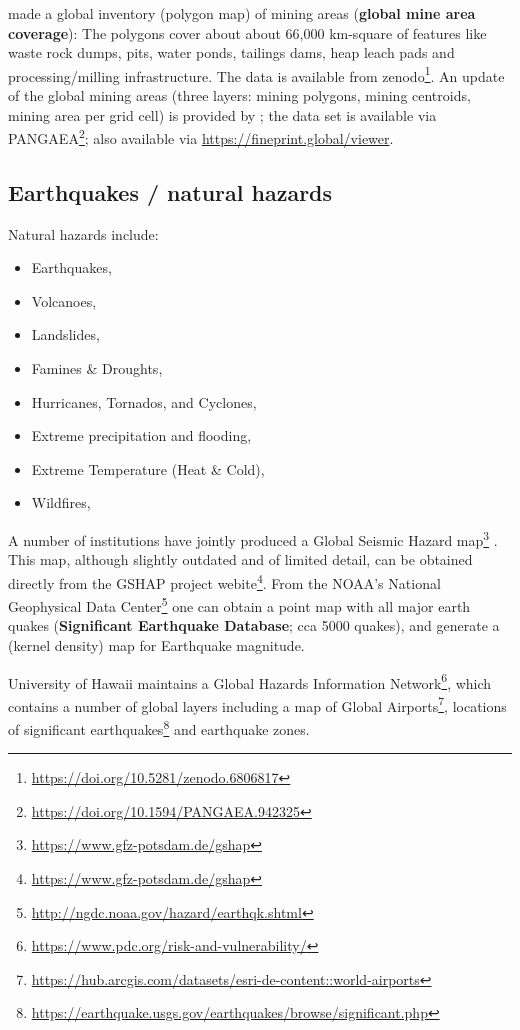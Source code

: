 \documentclass[
  graybox,natbib,nospthms]{svmono}
\providecommand{\tightlist}{%
  \setlength{\itemsep}{0pt}\setlength{\parskip}{0pt}}
\providecommand{\tightlist}{\setlength{\itemsep}{0pt}\setlength{\parskip}{0pt}}
\renewcommand{\href}[2]{#2 (\url{#1})}
\renewcommand{\href}[2]{#2\footnote{\url{#1}}}
\begin{document}
\citet{tang2023global} made a global inventory (polygon map) of mining areas (\textbf{global mine area coverage}):
The polygons cover about about 66,000 km-square of features like
waste rock dumps, pits, water ponds, tailings dams, heap leach
pads and processing/milling infrastructure.
The data is available from \href{https://doi.org/10.5281/zenodo.6806817}{zenodo}.
An update of the global mining areas (three layers: mining polygons, mining centroids,
mining area per grid cell) is provided by \citet{maus2022update}; the data set is available via
\href{https://doi.org/10.1594/PANGAEA.942325}{PANGAEA}; also available via \url{https://fineprint.global/viewer}.

\hypertarget{earthquakes-natural-hazards}{%
\subsection{Earthquakes / natural hazards}\label{earthquakes-natural-hazards}}

Natural hazards include:

\begin{itemize}
\tightlist
\item
  Earthquakes,
\item
  Volcanoes,
\item
  Landslides,
\item
  Famines \& Droughts,
\item
  Hurricanes, Tornados, and Cyclones,
\item
  Extreme precipitation and flooding,
\item
  Extreme Temperature (Heat \& Cold),
\item
  Wildfires,
\end{itemize}

A number of institutions have jointly produced a \href{https://www.gfz-potsdam.de/gshap}{Global Seismic Hazard map} \citep{shedlock2000gshap}.
This map, although slightly outdated and of limited detail, can be obtained directly
from the GSHAP project \href{https://www.gfz-potsdam.de/gshap}{webite}. From the
\href{http://ngdc.noaa.gov/hazard/earthqk.shtml}{NOAA's National Geophysical Data Center} one
can obtain a point map with all major earth quakes (\textbf{Significant Earthquake Database}; cca 5000 quakes),
and generate a (kernel density) map for Earthquake magnitude.

University of Hawaii maintains a \href{https://www.pdc.org/risk-and-vulnerability/}{Global Hazards Information Network},
which contains a number of global layers including a \href{https://hub.arcgis.com/datasets/esri-de-content::world-airports}{map of Global Airports}, locations of \href{https://earthquake.usgs.gov/earthquakes/browse/significant.php}{significant earthquakes} and earthquake zones.
\end{document}
